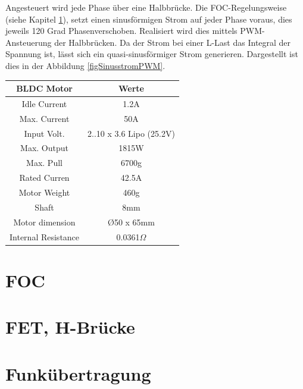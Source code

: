 Angesteuert wird jede Phase über eine Halbbrücke. Die FOC-Regelungsweise (siehe Kapitel \ref{tGl_FOC}), setzt einen sinusförmigen Strom auf jeder Phase voraus, dies jeweils 120 Grad \todo{Grad-Zeichen einfügen %
}Phasenverschoben. Realisiert wird dies mittels PWM-Ansteuerung der Halbbrücken. Da der Strom bei einer L-Last das Integral der Spannung ist, lässt sich ein quasi-sinusförmiger Strom generieren. Dargestellt ist dies in der Abbildung \ref{figSinusstromPWM}.

\begin{center}
	\begin{tabular}{|c|c|}
		\hline 
		\rule[-1ex]{0pt}{2.5ex}  BLDC Motor & Werte  \\ 
		\hline 
		\rule[-1ex]{0pt}{2.5ex} Idle Current & 1.2A \\ 
		\hline 
		\rule[-1ex]{0pt}{2.5ex} Max. Current & 50A \\ 
		\hline
		\rule[-1ex]{0pt}{2.5ex} Input Volt. & 2..10 x 3.6 Lipo (25.2V) \\ 
		\hline
		\rule[-1ex]{0pt}{2.5ex} Max. Output & 1815W \\ 
		\hline
		\rule[-1ex]{0pt}{2.5ex} Max. Pull & 6700g \\ 
		\hline
		\rule[-1ex]{0pt}{2.5ex} Rated Curren & 42.5A \\ 
		\hline
		\rule[-1ex]{0pt}{2.5ex} Motor Weight & 460g \\ 
		\hline
		\rule[-1ex]{0pt}{2.5ex} Shaft & 8mm \\ 
		\hline
		\rule[-1ex]{0pt}{2.5ex} Motor dimension & \O 50 x 65mm \\ 
		\hline
		\rule[-1ex]{0pt}{2.5ex} Internal Resistance & 0.0361$\Omega$ \\ 
		\hline	
	\end{tabular} 
	\label{tabBLDCdaten}
\end{center}






\section{FOC}
\label{tGl_FOC}
\section{FET, H-Brücke}
\label{tGl_HBrugg}
\section{Funkübertragung}
\label{tGl_RF}
